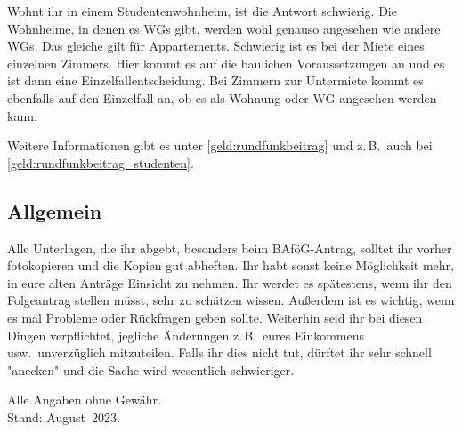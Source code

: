 \begin{multicols}{2}
Wohnt ihr in einem Studentenwohnheim, ist die Antwort schwierig.
Die Wohnheime, in denen es WGs gibt, werden wohl genauso angesehen wie andere WGs.
Das gleiche gilt für Appartements.
Schwierig ist es bei der Miete eines einzelnen Zimmers.
Hier kommt es auf die baulichen Voraussetzungen an und es ist dann eine Einzelfallentscheidung.
Bei Zimmern zur Untermiete kommt es ebenfalls auf den Einzelfall an, ob es als Wohnung oder WG angesehen werden kann.

Weitere Informationen gibt es unter \cref{geld:rundfunkbeitrag} und z.\,B.\ auch bei \cref{geld:rundfunkbeitrag_studenten}.

\subsection{Allgemein}
Alle Unterlagen, die ihr abgebt, besonders beim BAföG-Antrag, solltet ihr vorher fotokopieren und die Kopien gut abheften.
Ihr habt sonst keine Möglichkeit mehr, in eure alten Anträge Einsicht zu nehmen.
Ihr werdet es spätestens, wenn ihr den Folgeantrag stellen müsst, sehr zu schätzen wissen.
Außerdem ist es wichtig, wenn es mal Probleme oder Rückfragen geben sollte.
Weiterhin seid ihr bei diesen Dingen verpflichtet, jegliche Änderungen z.\,B.\ eures Einkommens usw.\ unverzüglich mitzuteilen.
Falls ihr dies nicht tut, dürftet ihr sehr schnell "anecken" und die Sache wird wesentlich schwieriger.

\begin{flushright}
	Alle Angaben ohne Gewähr.\\
	Stand: August~2023.
\end{flushright}


\end{multicols}

